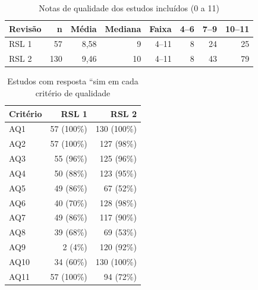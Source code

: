 \begin{table}[htbp]
\centering
\caption{Notas de qualidade dos estudos incluídos (0 a 11)}
\label{tab:qualidade-resumo}
\small
\begin{tabular}{lrrrrrrr}
\hline
\textbf{Revisão} & \textbf{n} & \textbf{Média} & \textbf{Mediana} & \textbf{Faixa} & \textbf{4--6} & \textbf{7--9} & \textbf{10--11} \\
\hline
RSL 1 & 57 & 8,58 & 9 & 4--11 & 8 & 24 & 25 \\
RSL 2 & 130 & 9,46 & 10 & 4--11 & 8 & 43 & 79 \\
\hline
\end{tabular}
\end{table}
\begin{table}[htbp]
\centering
\caption{Estudos com resposta ``sim em cada critério de qualidade}
\label{tab:qualidade-itens}
\small
\begin{tabular}{lrr}
\hline
\textbf{Critério} & \textbf{RSL 1} & \textbf{RSL 2} \\
\hline
AQ1 & 57 (100\%) & 130 (100\%) \\
AQ2 & 57 (100\%) & 127 (98\%) \\
AQ3 & 55 (96\%) & 125 (96\%) \\
AQ4 & 50 (88\%) & 123 (95\%) \\
AQ5 & 49 (86\%) & 67 (52\%) \\
AQ6 & 40 (70\%) & 128 (98\%) \\
AQ7 & 49 (86\%) & 117 (90\%) \\
AQ8 & 39 (68\%) & 69 (53\%) \\
AQ9 & 2 (4\%) & 120 (92\%) \\
AQ10 & 34 (60\%) & 130 (100\%) \\
AQ11 & 57 (100\%) & 94 (72\%) \\
\hline
\end{tabular}
\end{table}
